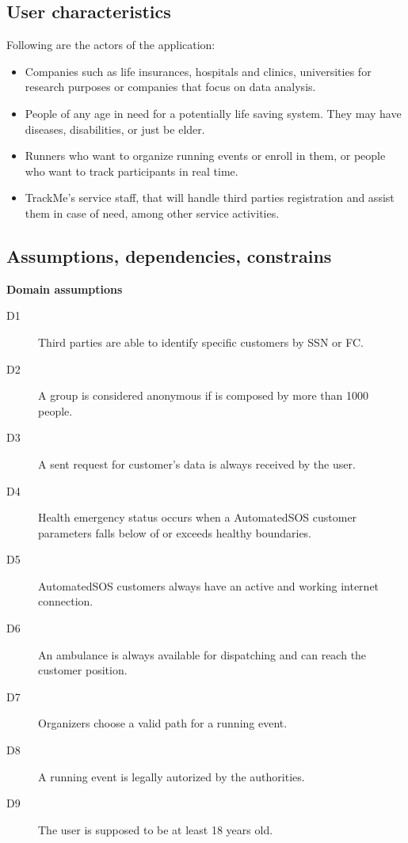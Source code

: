 \documentclass[../main.tex]{subfiles}
\begin{document}
\subsection{User characteristics}
Following are the actors of the application:
\begin{itemize}
	\item Companies such as life insurances, hospitals and clinics, universities for research purposes or companies that focus on data analysis.
	\item People of any age in need for a potentially life saving system. They may have diseases, disabilities, or just be elder.
	\item Runners who want to organize running events or enroll in them, or people who want to track participants in real time.
	\item TrackMe's service staff, that will handle third parties registration and assist them in case of need, among other service activities.
\end{itemize}

\subsection{Assumptions, dependencies, constrains}

{\bf Domain assumptions}

\begin{description}

	\item [D1] Third parties are able to identify specific customers by SSN or FC.
	\item [D2] A group is considered anonymous if is composed by more than 1000 people.
	\item [D3] A sent request for customer's data is always received by the user.
	\item [D4] Health emergency status occurs when a AutomatedSOS customer parameters falls below of or exceeds healthy boundaries.
	\item [D5] AutomatedSOS customers always have an active and working internet connection.
	\item [D6] An ambulance is always available for dispatching and can reach the customer position.
	\item [D7] Organizers choose a valid path for a running event.
	\item [D8] A running event is legally autorized by the authorities.
	\item [D9] The user is supposed to be at least 18 years old.

\end{description}
\end{document}
